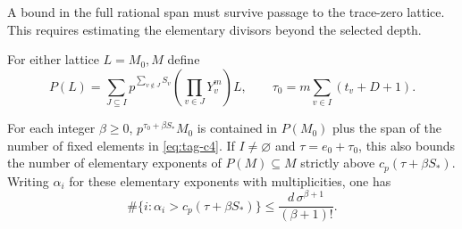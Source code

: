 A bound in the full rational span must survive passage to the trace-zero lattice. This requires estimating the elementary divisors beyond the selected depth.

For either lattice \(L=M_0,M\) define
\[
 P(L)=\sum_{J\subseteq I}
       p^{\sum_{v\notin J} S_v}
              \left(\prod_{v\in J}Y_v^m\right)L,\qquad
 \tau_0=m\sum_{v\in I}(t_v+D+1).
\]
\begin{proposition}\label{prop:orbit-smith-tail}
For each integer \(\beta\ge0\), \(p^{\tau_0+\beta S_*}M_0\)
is contained in \(P(M_0)\) plus the span of the number of fixed
elements in \textup{\eqref{eq:tag-c4}}. If \(I\ne\varnothing\) and
\(\tau=e_0+\tau_0\), this also bounds the number of elementary
exponents of \(P(M)\subseteq M\) strictly above
\(c_p(\tau+\beta S_*)\). Writing \(\alpha_i\) for these elementary exponents with multiplicities, one has
\[
 \#\{i:\alpha_i>c_p(\tau+\beta S_*)\}\le \frac{d\,\sigma^{\beta+1}}{(\beta+1)!}.
\]

\end{proposition}

